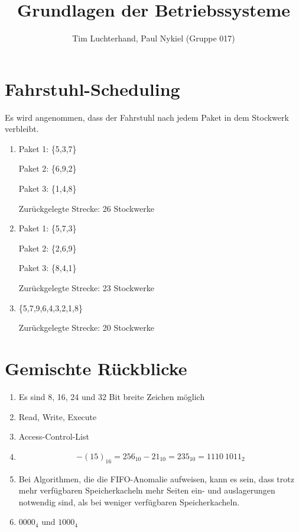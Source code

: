 \documentclass[DIN, pagenumber=false, fontsize=11pt, parskip=half]{scrartcl}
\title{Grundlagen der Betriebssysteme}
\author{Tim Luchterhand, Paul Nykiel (Gruppe 017)}
\begin{document}
    \maketitle
    \section{Fahrstuhl-Scheduling}
    Es wird angenommen, dass der Fahrstuhl nach jedem Paket in dem Stockwerk verbleibt.
    \begin{enumerate}[label=(\alph*)]
            \item 
                Paket 1: \{5,3,7\} 

                Paket 2: \{6,9,2\} 

                Paket 3: \{1,4,8\} 

                Zurückgelegte Strecke: 26 Stockwerke
            \item 
                Paket 1: \{5,7,3\} 

                Paket 2: \{2,6,9\} 

                Paket 3: \{8,4,1\} 

                Zurückgelegte Strecke: 23 Stockwerke

            \item 
                \{5,7,9,6,4,3,2,1,8\}

                Zurückgelegte Strecke: 20 Stockwerke
    \end{enumerate}

    \section{Gemischte Rückblicke}
    \begin{enumerate}[label=(\alph*)]
        \item Es sind 8, 16, 24 und 32 Bit breite Zeichen möglich
        \item Read, Write, Execute
        \item Access-Control-List
        \item 
            \begin{eqnarray*}
                -{(15)}_{16} = {256}_{10} - {21}_{10} = {235}_{10} = {1110\ 1011}_{2}
            \end{eqnarray*}
        \item Bei Algorithmen, die die FIFO-Anomalie aufweisen, kann es sein, dass trotz mehr verfügbaren Speicherkacheln mehr Seiten ein- und auslagerungen 
            notwendig sind, als bei weniger verfügbaren Speicherkacheln.
        \item
            ${0000}_4$ und ${1000}_4$
    \end{enumerate}
\end{document}
